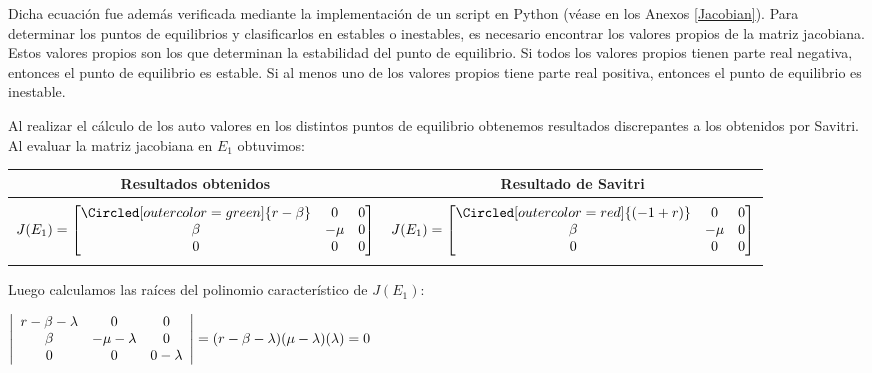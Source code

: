 \documentclass{wscpaperproc}
\theoremstyle{wsc}
\begin{document}
Dicha ecuación fue además verificada mediante la implementaci\'on de un script en Python (v\'ease en los Anexos \ref{Jacobian}).
Para determinar los puntos de equilibrios y clasificarlos en estables o inestables, es necesario encontrar los valores propios
de la matriz jacobiana. Estos valores propios son los que determinan la estabilidad del punto de equilibrio. Si todos los valores
propios tienen parte real negativa, entonces el punto de equilibrio es estable. Si al menos uno de los valores propios tiene parte real positiva,
entonces el punto de equilibrio es inestable. \par
Al realizar el c\'alculo de los auto valores en los distintos puntos de equilibrio obtenemos resultados discrepantes a los obtenidos por Savitri.
Al evaluar la matriz jacobiana en $E_1$ obtuvimos:
\begin{center}
	\begin{tabular}{ c c }
		\toprule
		\textbf{Resultados obtenidos}                        & \textbf{Resultado de Savitri} \\
		\midrule                                                                             \\
		\addlinespace[-2ex]
		$J(E_1) =\label{Characteristic000t} \begin{bmatrix}
				                                    \Circled[outer color=green]{r-\beta} & 0    & 0 \\
				                                    \beta                                & -\mu & 0 \\
				                                    0                                    & 0    & 0
			                                    \end{bmatrix}$ &
		$J(E_1) =\label{Characteristic000f} \begin{bmatrix}
				                                    \Circled[outer color=red]{(-1+ r) } & 0    & 0 \\
				                                    \beta                               & -\mu & 0 \\
				                                    0                                   & 0    & 0
			                                    \end{bmatrix}$   \\
		\addlinespace[1.5ex]

		\bottomrule
	\end{tabular}
\end{center}


Luego calculamos las raíces del polinomio característico de  $J(E_1)$:
\begin{center}


	$\left|\begin{array}{c c c}
			r-\beta-\lambda & 0            & 0         \\
			\beta           & -\mu-\lambda & 0         \\
			0               & 0            & 0-\lambda \\
		\end{array}	\right|
		=
		(r-\beta-\lambda)(\mu-\lambda)(\lambda) = 0
	$
\end{center}
\end{document}
